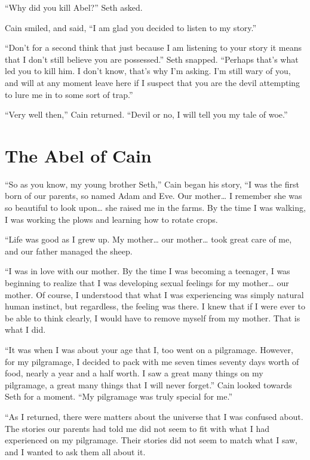 \documentclass[12pt,twoside,titlepage]{report}
\begin{document}
``Why did you kill Abel?'' Seth asked.

Cain smiled, and said, ``I am glad you decided to listen to my story.''

``Don't for a second think that just because I am listening to your
story it means that I don't still believe you are possessed.'' Seth
snapped. ``Perhaps that's what led you to kill him. I don't know, that's
why I'm asking. I'm still wary of you, and will at any moment leave here
if I suspect that you are the devil attempting to lure me in to some
sort of trap.''

``Very well then,'' Cain returned. ``Devil or no, I will tell you my
tale of woe.''

\hypertarget{the-abel-of-cain}{%
\chapter{The Abel of Cain}\label{the-abel-of-cain}}

``So as you know, my young brother Seth,'' Cain began his story, ``I was
the first born of our parents, so named Adam and Eve. Our mother\ldots{}
I remember she was so beautiful to look upon\ldots{} she raised me in
the farms. By the time I was walking, I was working the plows and
learning how to rotate crops.

``Life was good as I grew up. My mother\ldots{} our mother\ldots{} took
great care of me, and our father managed the sheep.

``I was in love with our mother. By the time I was becoming a teenager,
I was beginning to realize that I was developing sexual feelings for my
mother\ldots{} our mother. Of course, I understood that what I was
experiencing was simply natural human instinct, but regardless, the
feeling was there. I knew that if I were ever to be able to think
clearly, I would have to remove myself from my mother. That is what I
did.

``It was when I was about your age that I, too went on a pilgramage.
However, for my pilgramage, I decided to pack with me seven times
seventy days worth of food, nearly a year and a half worth. I saw a
great many things on my pilgramage, a great many things that I will
never forget.'' Cain looked towards Seth for a moment. ``My pilgramage
was truly special for me.''

``As I returned, there were matters about the universe that I was
confused about. The stories our parents had told me did not seem to fit
with what I had experienced on my pilgramage. Their stories did not seem
to match what I saw, and I wanted to ask them all about it.
\end{document}
